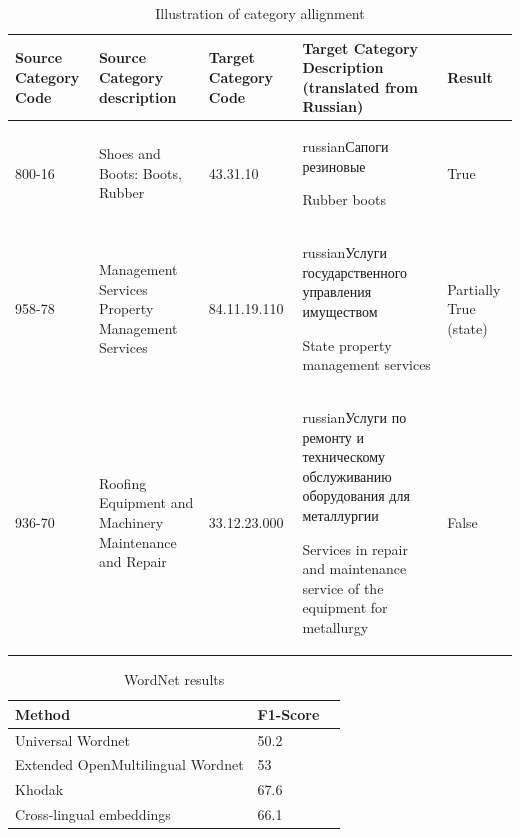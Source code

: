 \documentclass[11pt,a4paper]{article}
\begin{document}
\begin{center}
       \begin{table}
		\label{table-annotation}
		\small
		\centering
		\caption{Illustration of category allignment}
		\begin{tabular}{|p{2cm}|p{4cm}|p{2cm}|p{4cm}|p{1cm}|}
			\hline
			{Source Category Code} & {Source Category description}& {Target Category Code} & {Target Category Description (translated from Russian)} & {Result}\\
			\hline
			{800-16} & {Shoes and Boots: Boots, Rubber} &
			{43.31.10} & {\begin{otherlanguage*}{russian}Сапоги резиновые\end{otherlanguage*} \newline Rubber boots} &
			{True}
			\\
			\hline
			958-78 & Management Services Property Management Services &
			{84.11.19.110} & \begin{otherlanguage*}{russian}Услуги государственного управления имуществом\end{otherlanguage*} \newline State property management services &
			Partially True (state)
			\\
			\hline
			936-70 & {Roofing Equipment and Machinery Maintenance and Repair} &
			{33.12.23.000} & \begin{otherlanguage*}{russian}Услуги по ремонту и техническому обслуживанию оборудования для металлургии
			\end{otherlanguage*} \newline Services in repair and maintenance service of the equipment for metallurgy &
			False
			\\
			\hline


		\end{tabular}
	\end{table}
\end{center}

\begin{table}[ht]
	\small
	\caption{WordNet results}
	\label{table-wordnet-results}
	\begin{tabular}{|l|l|l|}

		\hline
		{Method} & {F1-Score} \\ \hline
		Universal Wordnet & 50.2 \\ \hline
		Extended OpenMultilingual Wordnet & 53 \\ \hline
		Khodak & 67.6 \\ \hline
		Cross-lingual embeddings & 66.1 \\
		\hline
	\end{tabular}
\end{table}
\end{document}
